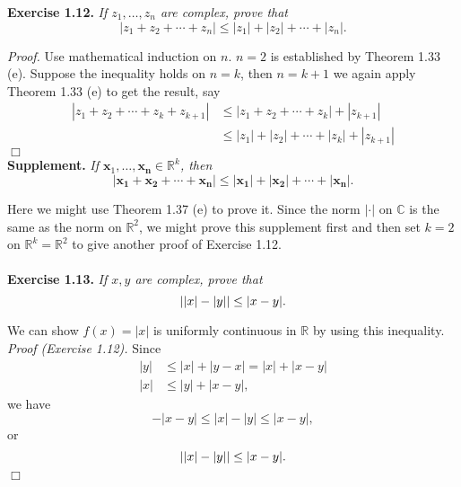 \documentclass{article}
\begin{document}



\textbf{Exercise 1.12.}
\emph{If $z_1, \ldots, z_n$ are complex, prove that
$$|z_1 + z_2 + \cdots + z_n| \leq |z_1| + |z_2| + \cdots + |z_n|.$$}

\emph{Proof.}
Use mathematical induction on $n$. $n = 2$ is established by Theorem 1.33 (e).
Suppose the inequality holds on $n = k$, then $n = k + 1$ we again apply Theorem 1.33 (e)
to get the result, say
\begin{align*}
|z_1 + z_2 + \cdots + z_k + z_{k+1}|
&\leq |z_1 + z_2 + \cdots + z_k| + |z_{k+1}| \\
&\leq |z_1| + |z_2| + \cdots + |z_k| + |z_{k+1}|
\end{align*}
$\Box$ \\

\textbf{Supplement.}
\emph{If $\mathbf{x}_1, \ldots, \mathbf{x_n} \in \mathbb{R}^k$, then
$$|\mathbf{x_1} + \mathbf{x_2} + \cdots + \mathbf{x_n}|
\leq |\mathbf{x_1}| + |\mathbf{x_2}| + \cdots + |\mathbf{x_n}|.$$}

Here we might use Theorem 1.37 (e) to prove it.
Since the norm $|\cdot|$ on $\mathbb{C}$ is the same as the norm on $\mathbb{R}^2$,
we might prove this supplement first
and then set $k = 2$ on $\mathbb{R}^k = \mathbb{R}^2$
to give another proof of Exercise 1.12. \\\\






\textbf{Exercise 1.13.}
\emph{If $x, y$ are complex, prove that
$$\abs{ \abs{x} - \abs{y} } \leq \abs{x-y}.$$}

We can show $f(x) = |x|$ is uniformly continuous in $\mathbb{R}$ by using this inequality. \\

\emph{Proof (Exercise 1.12).}
Since
\begin{align*}
|y| &\leq |x| + |y-x| = |x| + |x-y| \\
|x| &\leq |y| + |x-y|,
\end{align*}
we have
$$-|x-y| \leq |x| - |y| \leq |x-y|,$$
or
$$\abs{|x| - |y|} \leq |x-y|.$$
$\Box$ \\\\
\end{document}
